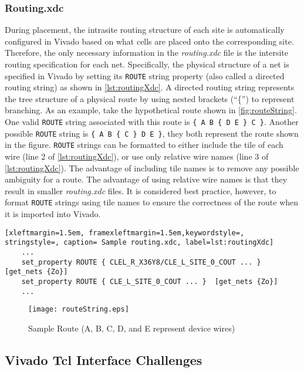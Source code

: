 \subsubsection{Routing.xdc} \label{sec:routingXdc}
During placement, the intrasite routing structure of each site is automatically
configured in Vivado based on what cells are placed onto the corresponding site.
Therefore, the only necessary information in the \textit{routing.xdc} file is
the intersite routing specification for each net. Specifically, the physical
structure of a net is specified in Vivado by setting its \texttt{ROUTE} string
property (also called a directed routing string) as shown in \autoref{lst:routingXdc}.
A directed routing string represents the tree structure of a physical
route by using nested brackets (``\{'') to represent branching. As an example,
take the hypothetical route shown in \autoref{fig:routeString}. One valid
\texttt{ROUTE} string associated with this route is \texttt{\{ A B \{ D E \} C
\}}. Another possible \texttt{ROUTE} string is \texttt{\{ A B \{ C \} D E \}},
they both represent the route shown in the figure. \texttt{ROUTE} strings can be
formatted to either include the tile of each wire (line 2 of
\autoref{lst:routingXdc}), or use only relative wire names (line 3 of
\autoref{lst:routingXdc}). The advantage of including tile names is to remove
any possible ambiguity for a route. The advantage of using relative wire names
is that they result in smaller \textit{routing.xdc} files. It is considered
best practice, however, to format \texttt{ROUTE} strings using tile names
to ensure the correctness of the route when it is imported into Vivado. 

\begin{lstlisting}[xleftmargin=1.5em, framexleftmargin=1.5em,keywordstyle=,
stringstyle=, caption= Sample routing.xdc, label=lst:routingXdc]
	...
	set_property ROUTE { CLEL_R_X36Y8/CLE_L_SITE_0_COUT ... }  [get_nets {Zo}]
	set_property ROUTE { CLE_L_SITE_0_COUT ... }  [get_nets {Zo}]
	...
\end{lstlisting}

\begin{figure}[t!]
  \centering
  \texttt{[image: routeString.eps]}
  \caption{Sample Route (A, B, C, D, and E represent device wires)}
  \label{fig:routeString}
\end{figure}

\subsection{Vivado Tcl Interface Challenges} \label{sec:tclChallenges}

